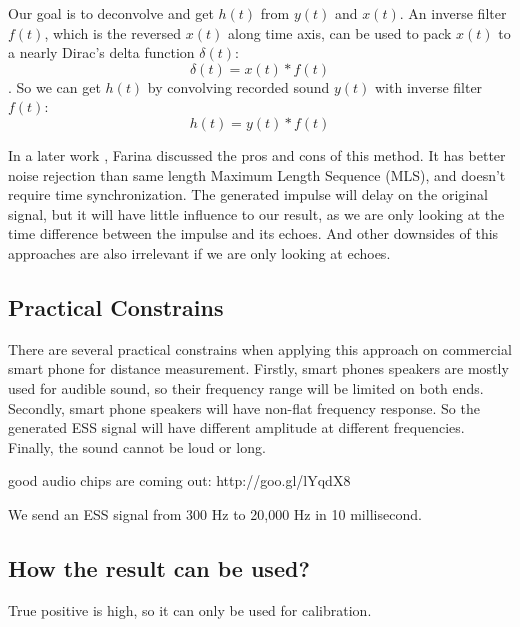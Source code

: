 Our goal is to deconvolve and get $h(t)$ from $y(t)$ and $x(t)$. An inverse filter $f(t)$, which is the reversed $x(t)$ along
time axis, can be used to pack $x(t)$ to a nearly Dirac's delta function $\delta(t)$:
\begin{equation}
\delta(t) = x(t) \ast f(t)
\end{equation}
. So we can get $h(t)$ by convolving recorded sound $y(t)$ with inverse filter $f(t)$:
\begin{equation}
h(t) = y(t) \ast f(t)
\end{equation}


In a later work \cite{farina2007advancements}, Farina discussed the pros and cons of this method. 
It has better noise rejection than same length Maximum Length Sequence (MLS), and doesn't require 
time synchronization. The generated impulse will delay on the original signal, but it will 
have little influence to our result, as 
we are only looking at the time difference between the impulse and its echoes. 
And other downsides of this approaches are also irrelevant if we are only looking at echoes. 




\subsection{Practical Constrains}

There are several practical constrains when applying this approach on commercial smart phone for distance measurement. 
Firstly, smart phones speakers are mostly used for audible sound, so their frequency range will be limited on both ends. 
Secondly, smart phone speakers will have non-flat frequency response. So the generated ESS signal will 
have different amplitude at different frequencies. Finally, the sound cannot be loud or long.



good audio chips are coming out:  http://goo.gl/lYqdX8


We send an ESS signal from 300 Hz to 20,000 Hz in 10 millisecond. 


\subsection{How the result can be used?}

True positive is high, so it can only be used for calibration.


